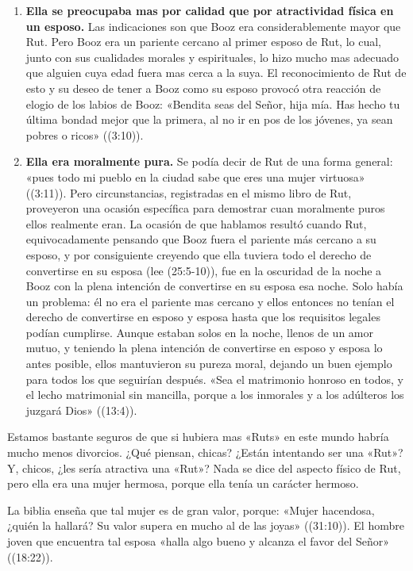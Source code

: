 \documentclass[12pt, twoside, openright]{book}
\begin{document}
\begin{enumerate}
\item \textbf{Ella se preocupaba mas por calidad que por atractividad física en un esposo.} Las indicaciones son que Booz era considerablemente mayor que Rut. Pero Booz era un pariente cercano al primer esposo de Rut, lo cual, junto con sus cualidades morales y espirituales, lo hizo mucho mas adecuado que alguien cuya edad fuera mas cerca a la suya. El reconocimiento de Rut de esto y su deseo de tener a Booz como su esposo provocó otra reacción de elogio de los labios de Booz: «Bendita seas del Señor, hija mía. Has hecho tu última bondad mejor que la primera, al no ir en pos de los jóvenes, ya sean pobres o ricos» ((3:10)).
\item \textbf{Ella era moralmente pura.} Se podía decir de Rut de una forma general: «pues todo mi pueblo en la ciudad sabe que eres una mujer virtuosa» ((3:11)). Pero circunstancias, registradas en el mismo libro de Rut, proveyeron una ocasión específica para demostrar cuan moralmente puros ellos realmente eran. La ocasión de que hablamos resultó cuando Rut, equivocadamente pensando que Booz fuera el pariente más cercano a su esposo, y por consiguiente creyendo que ella tuviera todo el derecho de convertirse en su esposa (lee (25:5-10)), fue en la oscuridad de la noche a Booz con la plena intención de convertirse en su esposa esa noche. Solo había un problema: él no era el pariente mas cercano y ellos entonces no tenían el derecho de convertirse en esposo y esposa hasta que los requisitos legales podían cumplirse. Aunque estaban solos en la noche, llenos de un amor mutuo, y teniendo la plena intención de convertirse en esposo y esposa lo antes posible, ellos mantuvieron su pureza moral, dejando un buen ejemplo para todos los que seguirían después. «Sea el matrimonio honroso en todos, y el lecho matrimonial sin mancilla, porque a los inmorales y a los adúlteros los juzgará Dios» ((13:4)).
\end{enumerate}
Estamos bastante seguros de que si hubiera mas «Ruts» en este mundo habría mucho menos divorcios. ¿Qué piensan, chicas? ¿Están intentando ser una «Rut»? Y, chicos, ¿les sería atractiva una «Rut»? Nada se dice del aspecto físico de Rut, pero ella era una mujer hermosa, porque ella tenía un carácter hermoso.

La biblia enseña que tal mujer es de gran valor, porque: «Mujer hacendosa, ¿quién la hallará? Su valor supera en mucho al de las joyas» ((31:10)). El hombre joven que encuentra tal esposa «halla algo bueno y alcanza el favor del Señor» ((18:22)).
\end{document}
